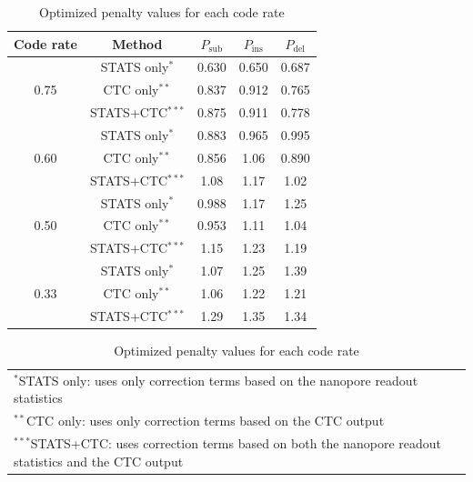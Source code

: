 \documentclass[sotsuron]{kuee}
\begin{document}
\begin{table}
  \centering
  \caption{Optimized penalty values for each code rate}
  \label{tab:appendix_params_p}
  \footnotesize
  \begin{tabular}{c|c|ccc}
    \hline
    Code rate & Method & $P_{\mathrm{sub}}$ & $P_{\mathrm{ins}}$ & $P_{\mathrm{del}}$ \\
    \hline
    \multirow{3}{*}{0.75} & STATS only$^{*}$ & 0.630 & 0.650 & 0.687 \\
    & CTC only$^{**}$ & 0.837 & 0.912 & 0.765 \\
    & STATS+CTC$^{***}$ & 0.875 & 0.911 & 0.778 \\
    \hline
    \multirow{3}{*}{0.60} & STATS only$^{*}$ & 0.883 & 0.965 & 0.995 \\
    & CTC only$^{**}$ & 0.856 & 1.06 & 0.890 \\
    & STATS+CTC$^{***}$ & 1.08 & 1.17 & 1.02 \\
    \hline
    \multirow{3}{*}{0.50} & STATS only$^{*}$ & 0.988 & 1.17 & 1.25 \\
    & CTC only$^{**}$ & 0.953 & 1.11 & 1.04 \\
    & STATS+CTC$^{***}$ & 1.15 & 1.23 & 1.19 \\
    \hline
    \multirow{3}{*}{0.33} & STATS only$^{*}$ & 1.07 & 1.25 & 1.39 \\
    & CTC only$^{**}$ & 1.06 & 1.22 & 1.21 \\
    & STATS+CTC$^{***}$ & 1.29 & 1.35 & 1.34 \\
    \hline
  \end{tabular}
  
  \small
  \vspace{0.3cm}
  
  \noindent
  \begin{tabular}{@{}l@{}}
    $^{*}$STATS only: uses only correction terms based on the nanopore readout statistics \\
    $^{**}$CTC only: uses only correction terms based on the CTC output \\
    $^{***}$STATS+CTC: uses correction terms based on both the nanopore readout statistics and the CTC output
  \end{tabular}
\end{table}
\end{document}
